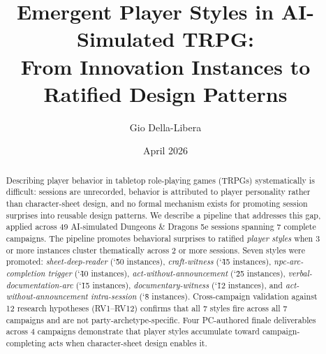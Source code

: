 \documentclass{article}
\title{\textbf{Emergent Player Styles in AI-Simulated TRPG:\\
From Innovation Instances to Ratified Design Patterns}}
\author[1]{Gio Della-Libera}
\affil[1]{Independent Research, Seattle, WA \\ \texttt{giodl@microsoft.com}}
\date{April 2026}
\begin{document}
\maketitle

\begin{abstract}
Describing player behavior in tabletop role-playing games (TRPGs) systematically is
difficult: sessions are unrecorded, behavior is attributed to player personality rather
than character-sheet design, and no formal mechanism exists for promoting session
surprises into reusable design patterns. We describe a pipeline that addresses this
gap, applied across 49 AI-simulated Dungeons \& Dragons 5e sessions spanning 7
complete campaigns. The pipeline promotes behavioral surprises to ratified
\textit{player styles} when 3 or more instances cluster thematically across 2 or more
sessions. Seven styles were promoted: \textit{sheet-deep-reader} (\char`\~50 instances),
\textit{craft-witness} (\char`\~45 instances), \textit{npc-arc-completion trigger}
(\char`\~40 instances), \textit{act-without-announcement} (\char`\~25 instances),
\textit{verbal-documentation-arc} (\char`\~15 instances), \textit{documentary-witness}
(\char`\~12 instances), and \textit{act-without-announcement intra-session} (\char`\~8 instances).
Cross-campaign validation against 12 research hypotheses (RV1--RV12) confirms that all
7 styles fire across all 7 campaigns and are not party-archetype-specific. Four
PC-authored finale deliverables across 4 campaigns demonstrate that player styles
accumulate toward campaign-completing acts when character-sheet design enables it.
\end{abstract}

\tableofcontents
\newpage










\end{document}
